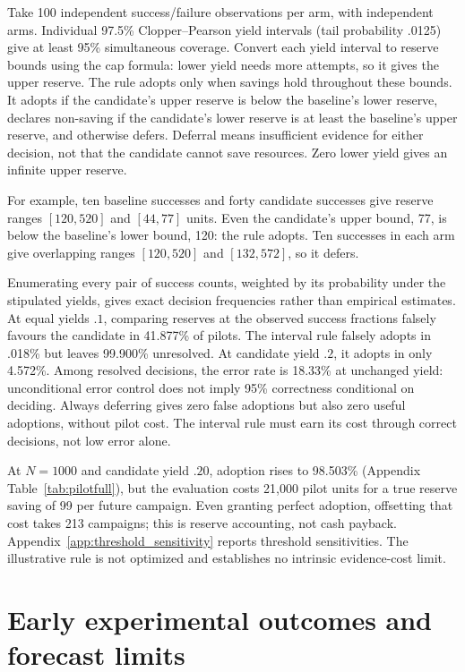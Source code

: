 Take 100 independent success/failure observations per arm, with independent arms. Individual 97.5\% Clopper--Pearson yield intervals (tail probability .0125) give at least 95\% simultaneous coverage. Convert each yield interval to reserve bounds using the cap formula: lower yield needs more attempts, so it gives the upper reserve. The rule adopts only when savings hold throughout these bounds. It adopts if the candidate's upper reserve is below the baseline's lower reserve, declares non-saving if the candidate's lower reserve is at least the baseline's upper reserve, and otherwise defers. Deferral means insufficient evidence for either decision, not that the candidate cannot save resources. Zero lower yield gives an infinite upper reserve.

For example, ten baseline successes and forty candidate successes give reserve ranges $[120,520]$ and $[44,77]$ units. Even the candidate's upper bound, 77, is below the baseline's lower bound, 120: the rule adopts. Ten successes in each arm give overlapping ranges $[120,520]$ and $[132,572]$, so it defers. 

Enumerating every pair of success counts, weighted by its probability under the stipulated yields, gives exact decision frequencies rather than empirical estimates. At equal yields $.1$, comparing reserves at the observed success fractions falsely favours the candidate in 41.877\% of pilots. The interval rule falsely adopts in .018\% but leaves 99.900\% unresolved. At candidate yield $.2$, it adopts in only 4.572\%. Among resolved decisions, the error rate is 18.33\% at unchanged yield: unconditional error control does not imply 95\% correctness conditional on deciding. Always deferring gives zero false adoptions but also zero useful adoptions, without pilot cost. The interval rule must earn its cost through correct decisions, not low error alone.



At $N=1000$ and candidate yield $.20$, adoption rises to 98.503\% (Appendix Table~\ref{tab:pilotfull}), but the evaluation costs 21,000 pilot units for a true reserve saving of 99 per future campaign. Even granting perfect adoption, offsetting that cost takes 213 campaigns; this is reserve accounting, not cash payback. Appendix~\ref{app:threshold_sensitivity} reports threshold sensitivities. The illustrative rule is not optimized and establishes no intrinsic evidence-cost limit.

\section{Early experimental outcomes and forecast limits}
\label{sec:scope}
